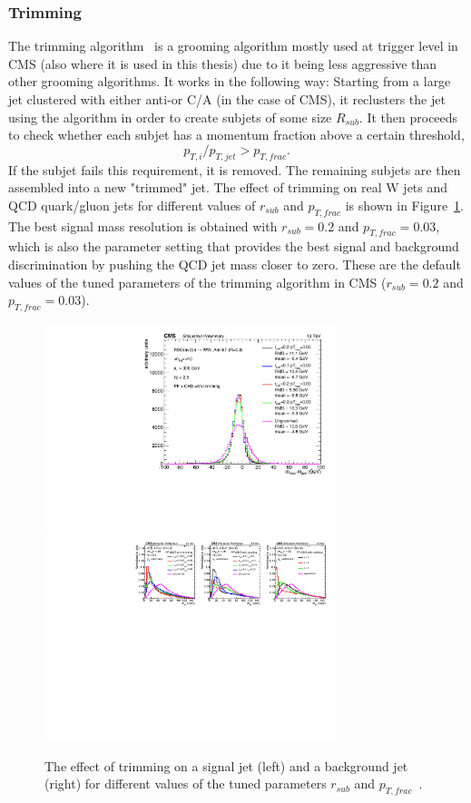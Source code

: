 \subsubsection{Trimming}
\label{sec:objreco:trimming}
The trimming algorithm~\cite{Krohn:2009th} is a grooming algorithm mostly used at trigger level in CMS (also where it is used in this thesis) due to it being less aggressive than other grooming algorithms. It works in the following way: Starting from a large jet clustered with either anti-\kt or C/A (in the case of CMS), it reclusters the jet using the \kt algorithm in order to create subjets of some size $R_{sub}$.  It then proceeds to check whether each subjet has a momentum fraction above a certain threshold,
\begin{equation*}
p_{T,i}/p_{T,jet}>p_{T,frac}.
\end{equation*}
If the subjet fails this requirement, it is removed. The remaining subjets are then assembled into a new "trimmed" jet.
The effect of trimming on real W jets and QCD quark/gluon jets for different values of $r_{sub}$ and $p_{T,frac}$ is shown in Figure~\ref{fig:objreco:trimming}. 
The best signal mass resolution is obtained with $r_{sub}=0.2$ and $p_{T,frac}=0.03$, which is also the parameter setting that provides the best signal and background 
discrimination by pushing the QCD jet mass closer to zero. These are the default values of the tuned parameters of the trimming algorithm in CMS ($r_{sub}=0.2$ and $p_{T,frac}=0.03$).
\begin{figure}[h] 
    \centering 
    \includegraphics[height=6cm]{figures/event_reconstruction/sig_trimming.pdf}
    \includegraphics[height=6cm]{figures/event_reconstruction/bkg_trimming-noData.pdf}
    \caption{The effect of trimming on a signal jet (left) and a background jet (right) for different values of the tuned parameters $r_{sub}$ and $p_{T,frac}$~\cite{CMS-PAS-JME-14-001}.}
    \label{fig:objreco:trimming}
\end{figure}

